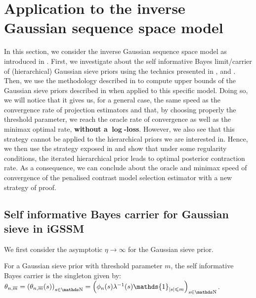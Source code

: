 \section{Application to the inverse Gaussian sequence space model}\label{BAYES_GAUSS}

In this section, we consider the inverse Gaussian sequence space model as introduced in .
First, we investigate about the self informative Bayes limit/carrier of (hierarchical) Gaussian sieve priors using the technics presented in ,  and .
Then, we use the methodology described in  to compute upper bounds of the Gaussian sieve priors described in  when applied to this specific model.
Doing so, we will notice that it gives us, for a general case, the same speed as the convergence rate of projection estimators and that, by choosing properly the threshold parameter, we reach the oracle rate of convergence as well as the minimax optimal rate, \textbf{without a} $\boldsymbol{\log}$\textbf{-loss}.
However, we also see that this strategy cannot be applied to the hierarchical priors we are interested in.
Hence, we then use the strategy exposed in  and show that under some regularity conditions, the iterated hierarchical prior leads to optimal posterior contraction rate.
As a consequence, we can conclude about the oracle and minimax speed of convergence of the penalised contrast model selection estimator with a new strategy of proof.

\subsection{Self informative Bayes carrier for Gaussian sieve in iGSSM}\label{BAYES_GAUSS_SELFINFORM}
We first consider the asymptotic $\eta \rightarrow \infty$ for the Gaussian sieve prior.

\begin{thm}\label{THM_BAYES_GAUSS_SELFINFORM}
For a Gaussian sieve prior with threshold parameter $m$, the self informative Bayes carrier is the singleton given by:
$\theta_{n, \overline{m}} = \left(\theta_{n, \overline{m}}(s)\right)_{s \in \N} = \left(\phi_{n}(s)\lambda^{-1}(s) \mathds{1}_{\vert s \vert \leq m}\right)_{s \in \N}$.
\reEnd
\end{thm}

